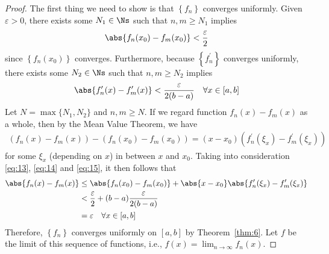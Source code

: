 \documentclass[thmcnt=section, 12pt]{elegantbook}
\begin{document}
\begin{proof}
    The first thing we need to show is that $\left\{f_n\right\}$ converges uniformly. Given $\varepsilon > 0$, there exists some $N_1 \in \Ns$ such that $n, m \geq N_1$ implies
    \begin{align}
        \abs{f_n(x_0) - f_m(x_0)} < \frac{\varepsilon}{2}
        \label{eq:13}
    \end{align}
    since $\left\{f_n(x_0)\right\}$ converges. Furthermore, because $\left\{f_n^\prime\right\}$ converges uniformly, there exists some $N_2 \in \Ns$ such that $n, m \geq N_2$ implies
    \begin{align}
        \abs{f_n^\prime(x) - f_m^\prime(x)}
        < \frac{\varepsilon}{2(b-a)}
        \quad \forall x \in [a, b]
        \label{eq:14}
    \end{align}
    Let $N = \max\{N_1, N_2\}$ and $n, m \geq N$. If we regard function $f_n(x) - f_m(x)$ as a whole, then by the Mean Value Theorem, we have 
    \begin{align}
        \left(f_n(x) - f_m(x)\right)
        - \left(f_n(x_0) - f_m(x_0)\right)
        = (x - x_0) \left(f_n^\prime(\xi_x) - f_m^\prime(\xi_x)\right)
        \label{eq:15}
    \end{align}
    for some $\xi_x$ (depending on $x$) in between $x$ and $x_0$. Taking into consideration \eqref{eq:13}, \eqref{eq:14} and \eqref{eq:15}, it then follows that 
    \begin{align*}
        \abs{f_n(x) - f_m(x)}
        &\leq \abs{f_n(x_0) - f_m(x_0)}
        + \abs{x-x_0} \abs{f_n^\prime(\xi_x) - f_m^\prime(\xi_x)} \\ 
        &< \frac{\varepsilon}{2} 
        + (b-a) \frac{\varepsilon}{2(b-a)} \\ 
        &= \varepsilon \quad \forall x \in [a, b]
    \end{align*}
    Therefore, $\left\{f_n\right\}$ converges uniformly on $[a, b]$ by Theorem~\ref{thm:6}. Let $f$ be the limit of this sequence of functions, i.e., $f(x) = \lim_{n \to \infty} f_n(x)$.


\end{proof}
\end{document}
